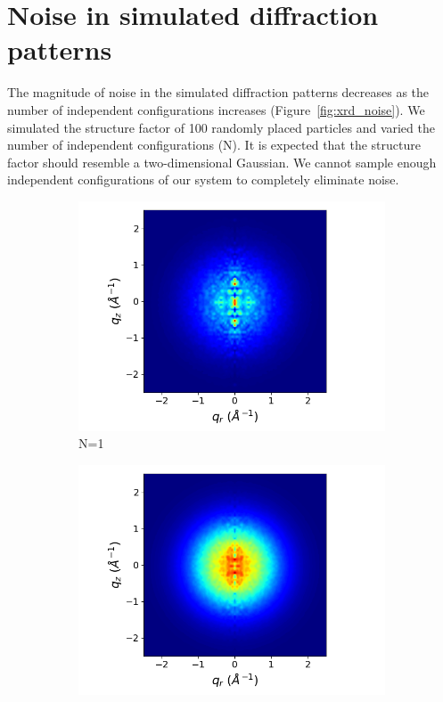 \documentclass{article}
\begin{document}
  \section{Noise in simulated diffraction patterns}\label{section:xrd_noise}
  
  The magnitude of noise in the simulated diffraction patterns decreases as 
  the number of independent configurations increases (Figure~\ref{fig:xrd_noise}).
  We simulated the structure factor of 100 randomly placed particles and varied 
  the number of independent configurations (N). It is expected that the structure
  factor should resemble a two-dimensional Gaussian. We cannot sample enough 
  independent configurations of our system to completely eliminate noise.
  
  \begin{figure}[!htb]
  \centering
  \begin{subfigure}{0.45\linewidth}
  \centering
  \includegraphics[width=\textwidth]{xrd_1frame.png}
  \caption{N=1}
  \end{subfigure}
  \begin{subfigure}{0.45\linewidth}
  \centering
  \includegraphics[width=\textwidth]{xrd_10frame.png}

\end{subfigure}
\end{figure}
\end{document}
